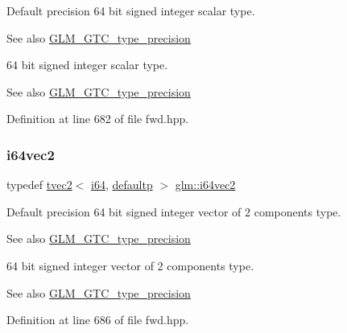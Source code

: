 Default precision 64 bit signed integer scalar type. \begin{DoxySeeAlso}{See also}
\mbox{\hyperlink{group__gtc__type__precision}{G\+L\+M\+\_\+\+G\+T\+C\+\_\+type\+\_\+precision}}
\end{DoxySeeAlso}
64 bit signed integer scalar type. \begin{DoxySeeAlso}{See also}
\mbox{\hyperlink{group__gtc__type__precision}{G\+L\+M\+\_\+\+G\+T\+C\+\_\+type\+\_\+precision}} 
\end{DoxySeeAlso}


Definition at line 682 of file fwd.\+hpp.

\mbox{\label{group__gtc__type__precision_ga5a03cb457be28a9a8b9e61163fe648a1}} 
\subsubsection{\texorpdfstring{i64vec2}{i64vec2}}
{\footnotesize\ttfamily typedef \mbox{\hyperlink{structglm_1_1tvec2}{tvec2}}$<$ \mbox{\hyperlink{group__gtc__type__precision_gac7a7eaad46064fc952b06df33689da23}{i64}}, \mbox{\hyperlink{namespaceglm_a0f04f086094c747d227af4425893f545a9d21ccd8b5a009ec7eb7677befc3bf51}{defaultp}} $>$ \mbox{\hyperlink{group__gtc__type__precision_ga5a03cb457be28a9a8b9e61163fe648a1}{glm\+::i64vec2}}}

Default precision 64 bit signed integer vector of 2 components type. \begin{DoxySeeAlso}{See also}
\mbox{\hyperlink{group__gtc__type__precision}{G\+L\+M\+\_\+\+G\+T\+C\+\_\+type\+\_\+precision}}
\end{DoxySeeAlso}
64 bit signed integer vector of 2 components type. \begin{DoxySeeAlso}{See also}
\mbox{\hyperlink{group__gtc__type__precision}{G\+L\+M\+\_\+\+G\+T\+C\+\_\+type\+\_\+precision}} 
\end{DoxySeeAlso}


Definition at line 686 of file fwd.\+hpp.

\mbox{\label{group__gtc__type__precision_ga189eb8d6a197bc491cabb6e1f120ecf4}} 
